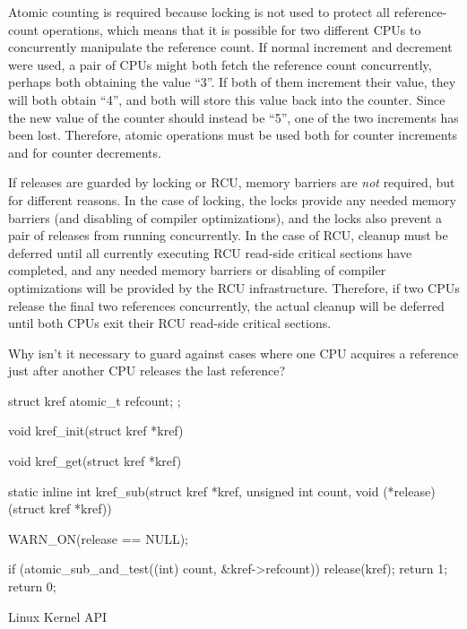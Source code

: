 Atomic counting is required
because locking is not used to protect all reference-count operations,
which means that it is possible for two different CPUs to concurrently
manipulate the reference count.
If normal increment and decrement were used, a pair of CPUs might both
fetch the reference count concurrently, perhaps both obtaining
the value ``3''.
If both of them increment their value, they will both obtain ``4'',
and both will store this value back into the counter.
Since the new value of the counter should instead be ``5'', one
of the two increments has been lost.
Therefore, atomic operations must be used both for counter increments
and for counter decrements.

If releases are guarded by locking or RCU,
memory barriers are \emph{not} required, but for different reasons.
In the case of locking, the locks provide any needed memory barriers
(and disabling of compiler optimizations), and the locks also
prevent a pair of releases from running concurrently.
In the case of RCU, cleanup must be deferred until all currently
executing RCU read-side critical sections have completed, and
any needed memory barriers or disabling of compiler optimizations
will be provided by the RCU infrastructure.
Therefore, if two CPUs release the final two references concurrently,
the actual cleanup will be deferred until both CPUs exit their
RCU read-side critical sections.

\QuickQuiz{}
	Why isn't it necessary to guard against cases where one CPU
	acquires a reference just after another CPU releases the last
	reference?
 \QuickQuizEnd

\begin{listing}[tbp]
\begin{linelabel}
\begin{VerbatimL}[commandchars=\\\[\]]
struct kref {						\lnlbl[kref:b]
	atomic_t refcount;
};							\lnlbl[kref:e]

void kref_init(struct kref *kref)										\lnlbl[init:e]

void kref_get(struct kref *kref)										\lnlbl[get:e]

static inline int					\lnlbl[sub:b]
kref_sub(struct kref *kref, unsigned int count,
         void (*release)(struct kref *kref))
{
	WARN_ON(release == NULL);

	if (atomic_sub_and_test((int) count,		\lnlbl[check]
	                        &kref->refcount)) {
		release(kref);				\lnlbl[rel]
		return 1;				\lnlbl[ret:1]
	}
	return 0;
}							\lnlbl[sub:e]
\end{VerbatimL}
\end{linelabel}
\caption{Linux Kernel  API}
\label{lst:together:Linux Kernel kref API}
\end{listing}

